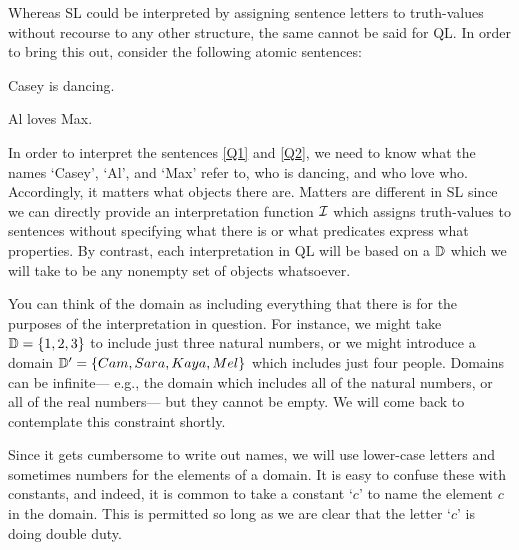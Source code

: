Whereas SL could be interpreted by assigning sentence letters to truth-values without recourse to any other structure, the same cannot be said for QL.
In order to bring this out, consider the following atomic sentences:

\begin{earg}
  \item[\ex{Q1}] Casey is dancing.
  \item[\ex{Q2}] Al loves Max.
\end{earg}

In order to interpret the sentences \ref{Q1} and \ref{Q2}, we need to know what the names `Casey', `Al', and `Max' refer to, who is dancing, and who love who.
Accordingly, it matters what objects there are.
Matters are different in SL since we can directly provide an interpretation function $\mathcal{I}$ which assigns truth-values to sentences without specifying what there is or what predicates express what properties.
By contrast, each interpretation in QL will be based on a  $\mathbb{D}$ which we will take to be any nonempty set of objects whatsoever.


You can think of the domain as including everything that there is for the purposes of the interpretation in question.
For instance, we might take $\mathbb{D}=\lbrace1,2,3\rbrace$ to include just three natural numbers, or we might introduce a domain $\mathbb{D}'=\lbrace Cam, Sara, Kaya, Mel\rbrace$ which includes just four people.
Domains can be infinite--- e.g., the domain which includes all of the natural numbers, or all of the real numbers--- but they cannot be empty.
We will come back to contemplate this constraint shortly.

Since it gets cumbersome to write out names, we will use lower-case letters and sometimes numbers for the elements of a domain.
It is easy to confuse these with constants, and indeed, it is common to take a constant `$c$' to name the element $c$ in the domain.
This is permitted so long as we are clear that the letter `$c$' is doing double duty.

